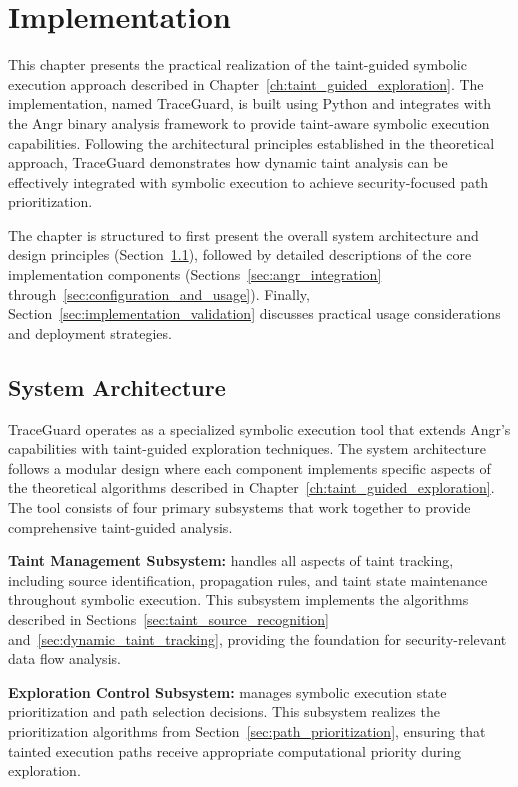 \chapter{Implementation}

This chapter presents the practical realization of the taint-guided symbolic execution approach described in Chapter~\ref{ch:taint_guided_exploration}. The implementation, named TraceGuard, is built using Python and integrates with the Angr binary analysis framework to provide taint-aware symbolic execution capabilities. Following the architectural principles established in the theoretical approach, TraceGuard demonstrates how dynamic taint analysis can be effectively integrated with symbolic execution to achieve security-focused path prioritization.

The chapter is structured to first present the overall system architecture and design principles (Section~\ref{sec:system_architecture}), followed by detailed descriptions of the core implementation components (Sections~\ref{sec:angr_integration} through~\ref{sec:configuration_and_usage}). Finally, Section~\ref{sec:implementation_validation} discusses practical usage considerations and deployment strategies.

\section{System Architecture}\label{sec:system_architecture}

TraceGuard operates as a specialized symbolic execution tool that extends Angr's capabilities with taint-guided exploration techniques. The system architecture follows a modular design where each component implements specific aspects of the theoretical algorithms described in Chapter~\ref{ch:taint_guided_exploration}. The tool consists of four primary subsystems that work together to provide comprehensive taint-guided analysis.

\textbf{Taint Management Subsystem:} handles all aspects of taint tracking, including source identification, propagation rules, and taint state maintenance throughout symbolic execution. This subsystem implements the algorithms described in Sections~\ref{sec:taint_source_recognition} and~\ref{sec:dynamic_taint_tracking}, providing the foundation for security-relevant data flow analysis.

\textbf{Exploration Control Subsystem:} manages symbolic execution state prioritization and path selection decisions. This subsystem realizes the prioritization algorithms from Section~\ref{sec:path_prioritization}, ensuring that tainted execution paths receive appropriate computational priority during exploration.

